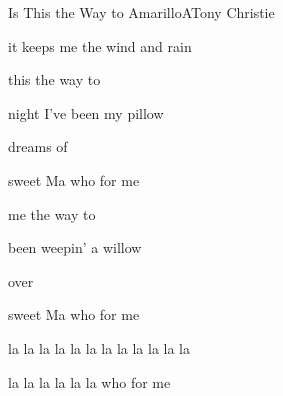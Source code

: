 \begin{SBSong}{Is This the Way to Amarillo}{A}{Tony Christie}
\begin{SBVerse}
     it keeps me   the wind and rain
  \end{SBVerse}

  \begin{SBChorus}
     this the way to 

     night I've been  my pillow

     dreams of 

     sweet Ma who  for me

     me the way to 

     been weepin'  a willow

     over 

     sweet Ma who  for me
  \end{SBChorus}

  \begin{SBVerse}
     la la la  la la la   la la la  la la la  

     la la la  la la la   who  for me
  \end{SBVerse}
\end{SBSong}
